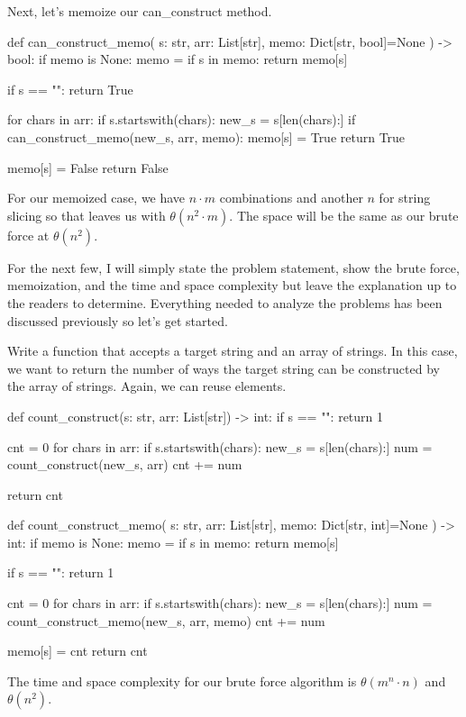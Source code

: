 \documentclass[12pt,dvipsnames,svgnames,x11names]{article}
\begin{document}
Next, let's memoize our can\_construct method.
\begin{python}
def can_construct_memo(
    s: str, 
    arr: List[str], 
    memo: Dict[str, bool]=None
    ) -> bool:
  if memo is None:
    memo = {}
  if s in memo:
    return memo[s]
    
  if s == "":
    return True
    
  for chars in arr:
    if s.startswith(chars):
      new_s = s[len(chars):]
      if can_construct_memo(new_s, arr, memo):
        memo[s] = True
        return True
            
  memo[s] = False
  return False
\end{python}
For our memoized case, we have \(n\cdot m\) combinations and another \(n\) for string slicing so that
leaves us with \(\theta(n^2\cdot m)\). The space will be the same as our brute force at \(\theta(n^2)\).
\par\smallskip
For the next few, I will simply state the problem statement, show the brute force, memoization, and 
the time and space complexity but leave the explanation up to the readers to determine. Everything 
needed to analyze the problems has been discussed previously so let's get started.
\par\medskip
Write a function that accepts a target string and an array of strings. In this case, we want to return the
number of ways the target string can be constructed by the array of strings. Again, we can reuse 
elements.
\begin{python}
def count_construct(s: str, arr: List[str]) -> int:
  if s == "":
    return 1
    
  cnt = 0
  for chars in arr:
    if s.startswith(chars):
      new_s = s[len(chars):]
      num = count_construct(new_s, arr)
      cnt += num
      
  return cnt
  
  
def count_construct_memo(
    s: str, 
    arr: List[str], 
    memo: Dict[str, int]=None
    ) -> int:
  if memo is None:
    memo = {}
  if s in memo:
    return memo[s]
    
  if s == "":
    return 1
    
  cnt = 0
  for chars in arr:
    if s.startswith(chars):
      new_s = s[len(chars):] 
      num = count_construct_memo(new_s, arr, memo)
      cnt += num
    
  memo[s] = cnt
  return cnt
\end{python}
The time and space complexity for our brute force algorithm is \(\theta(m^n\cdot n)\) and \(\theta(n^2)\).
\end{document}
